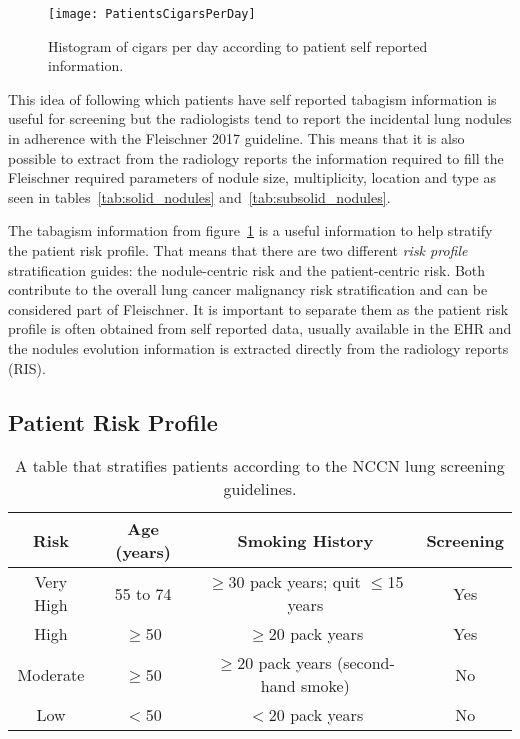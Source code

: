 \begin{center}
\begin{figure}
\begin{centering}
\texttt{[image: PatientsCigarsPerDay]}
\par\end{centering}
\caption{\label{fig:cigars_per_day} Histogram of cigars per day according to \nomeHsl{} patient self reported information.}
\end{figure}
\vspace*{-44pt}
\end{center}

This idea of following which patients have self reported tabagism information is useful for screening but the radiologists tend to report the incidental lung nodules in adherence with the Fleischner 2017 guideline. This means that it is also possible to extract from the radiology reports the information required to fill the Fleischner required parameters of nodule size, multiplicity, location and type as seen in tables~\ref{tab:solid_nodules} and~\ref{tab:subsolid_nodules}. 

The tabagism information from figure~\ref{fig:cigars_per_day} is a useful information to help stratify the patient risk profile. That means that there are two different \emph{risk profile} stratification guides: the nodule-centric risk and the patient-centric risk. Both contribute to the overall lung cancer malignancy risk stratification and can be considered part of Fleischner\cite{fleischner2017}. It is important to separate them as the patient risk profile is often obtained from self reported data, usually available in the EHR and the nodules evolution information is extracted directly from the radiology reports (RIS).

\subsection{Patient Risk Profile}

\begin{table}
\begin{centering}
\begin{tabular}{c|c|c|c}
\hline 
Risk & Age (years) & Smoking History & Screening \tabularnewline
\hline 
Very High & 55 to 74 & $\ge30$ pack years; quit $\le$15 years & Yes \tabularnewline
High & $\ge$50 & $\ge20$ pack years & Yes\tabularnewline 
Moderate & $\ge$50 & $\ge20$ pack years (second-hand smoke) & No \tabularnewline 
Low & $<$50 & $<20$ pack years & No\tabularnewline
\hline 
\end{tabular}
\end{centering}
\caption{\label{tab:nccn_risk_lung_nodule}A table that stratifies patients according to the NCCN lung screening
guidelines.}
\end{table}

